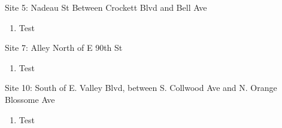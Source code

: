 \documentclass{article}
\newenvironment{pres}[2]{%
  \large{#2}
  \smallskip
}
{
  \goodbreak
  \smallskip
}
\begin{document}
\begin{pres}{}{Site 5: Nadeau St Between Crockett Blvd and Bell Ave}
  \begin{enumerate}[noitemsep]
      \item Test
  \end{enumerate}
\end{pres}

\begin{pres}{}{Site 7: Alley North of E 90th St }
  \begin{enumerate}[noitemsep]
      \item Test
  \end{enumerate}
\end{pres}

\begin{pres}{}{Site 10: South of E. Valley Blvd, between S. Collwood Ave and N. Orange Blossome Ave}
  \begin{enumerate}[noitemsep]
      \item Test
  \end{enumerate}
\end{pres}



\end{document}

